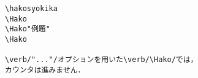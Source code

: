 \begin{verbatim}
\hakosyokika
\Hako
\Hako"例題"
\Hako

\verb/"..."/オプションを用いた\verb/\Hako/では，
カウンタは進みません．
\end{verbatim}

